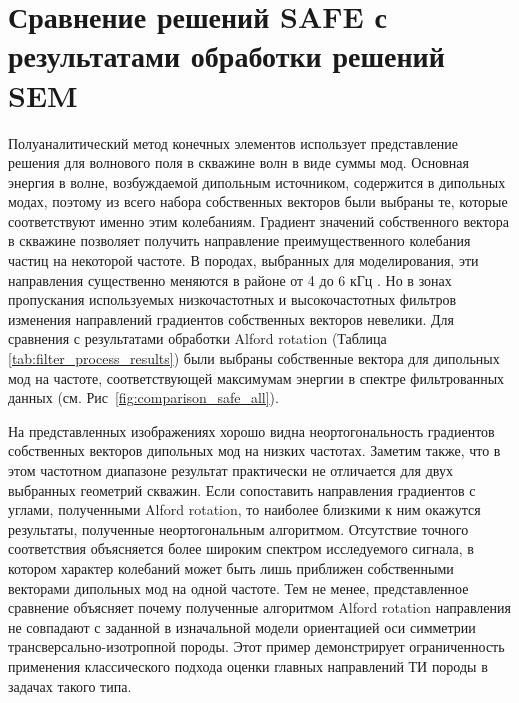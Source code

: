 \documentclass[a4paper,11pt]{article}
\begin{document}
\section{Сравнение решений SAFE с результатами обработки решений SEM}
\label{safe_comparison}

Полуаналитический метод конечных элементов использует представление решения для волнового поля в скважине волн в виде суммы мод. Основная энергия в волне, возбуждаемой дипольным источником, содержится в дипольных модах, поэтому из всего набора собственных векторов были выбраны те, которые соответствуют именно этим колебаниям. Градиент значений собственного вектора в скважине позволяет получить направление преимущественного колебания частиц на некоторой частоте. В породах, выбранных для моделирования, эти направления существенно меняются в районе от 4 до 6 кГц \cite{Zharnikov2015}. Но в зонах пропускания используемых низкочастотных и высокочастотных фильтров изменения направлений градиентов собственных векторов невелики. Для сравнения с результатами обработки Alford rotation (Таблица \ref{tab:filter_process_results}) были выбраны собственные вектора для дипольных мод на частоте, соответствующей максимумам энергии в спектре фильтрованных данных (см. Рис~\ref{fig:comparison_safe_all}).

На представленных изображениях хорошо видна неортогональность градиентов собственных векторов дипольных мод на низких частотах. Заметим также, что в этом частотном диапазоне результат практически не отличается для двух выбранных геометрий скважин. Если сопоставить направления градиентов с углами, полученными Alford rotation, то наиболее близкими к ним окажутся результаты, полученные неортогональным алгоритмом. Отсутствие точного соответствия объясняется более широким спектром исследуемого сигнала, в котором характер колебаний может быть лишь приближен собственными векторами дипольных мод на одной частоте. Тем не менее, представленное сравнение объясняет почему полученные алгоритмом Alford rotation направления не совпадают с заданной в изначальной модели ориентацией оси симметрии трансверсально-изотропной породы. Этот пример демонстрирует ограниченность применения классического подхода оценки главных направлений ТИ породы в задачах такого типа. 

\end{document}
